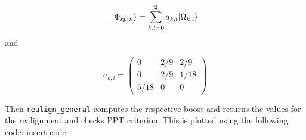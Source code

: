 \begin{equation}
    \lvert\Phi_{spin}\rangle = \sum_{k,l=0}^{2} a_{k,l}\lvert\Omega_{k,l}\rangle
\end{equation} and

\begin{equation}
    a_{k,l} =\begin{pmatrix}
            0 & 2/9 & 2/9 \\
            0 & 2/9 & 1/18 \\
            5/18 & 0 & 0 
            \end{pmatrix}
\end{equation}

Then \verb|realign_general| computes the respective boost and returns the values for the realignment and checks PPT criterion.
This is plotted using the following code: insert code